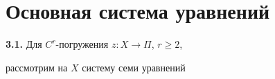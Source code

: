 

 


\pagestyle{plain} %


 


 




 


\maketitle 


 




 


\section{Основная система уравнений}





{\bf 3.1.} Для $C^r$-погружения $z:X\to\Pi$, $r\ge2$,


рассмотрим на $X$ систему семи уравнений


